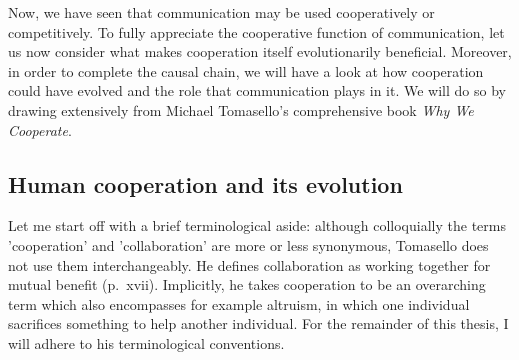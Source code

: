 Now, we have seen that communication may be used cooperatively or competitively. To fully appreciate the cooperative function of communication, let us now consider what makes cooperation itself evolutionarily beneficial. Moreover, in order to complete the causal chain, we will have a look at how cooperation could have evolved and the role that communication plays in it. We will do so by drawing extensively from Michael Tomasello's comprehensive \citeyear{Tomasello09} book \emph{Why We Cooperate}.

\subsection{Human cooperation and its evolution}
\label{sec:comm:cooperation}

Let me start off with a brief terminological aside: although colloquially the terms 'cooperation' and 'collaboration' are more or less synonymous, Tomasello does not use them interchangeably. He defines collaboration as working together for mutual benefit (p.~xvii). Implicitly, he takes cooperation to be an overarching term which also encompasses for example altruism, in which one individual sacrifices something to help another individual. For the remainder of this thesis, I will adhere to his terminological conventions.

